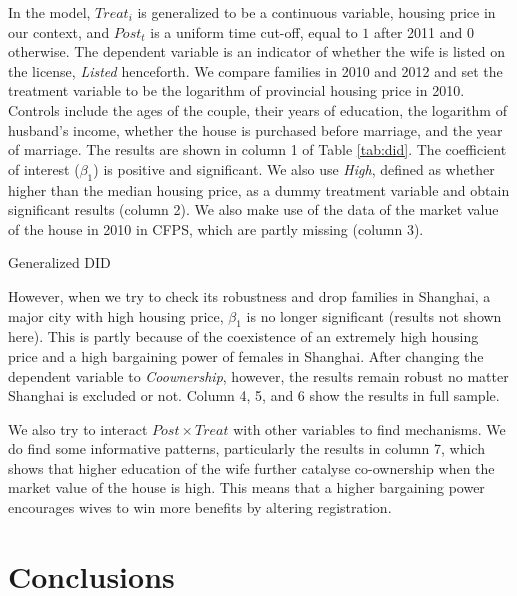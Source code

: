 \documentclass[11pt]{article}
\begin{document}
In the model, $Treat_{i}$ is generalized to be a continuous variable, housing price in our context, and $Post_t$ is a uniform time cut-off, equal to $1$ after 2011 and $0$ otherwise. The dependent variable is an indicator of whether the wife is listed on the license, \textit{Listed} henceforth. We compare families in 2010 and 2012 and set the treatment variable to be the logarithm of provincial housing price in 2010. Controls include the ages of the couple, their years of education, the logarithm of husband's income, whether the house is purchased before marriage, and the year of marriage. The results are shown in column 1 of Table \ref{tab:did}. The coefficient of interest ($\beta_1$) is positive and significant. We also use \textit{High}, defined as whether higher than the median housing price, as a dummy treatment variable and obtain significant results (column 2). We also make use of the data of the market value of the house in 2010 in CFPS, which are partly missing (column 3).  

\begin{table}
    \centering
    \caption{Generalized DID}
    \label{tab:did}
    \resizebox{\textwidth}{!}{
    }

\end{table}

However, when we try to check its robustness and drop families in Shanghai, a major city with high housing price, $\beta_1$ is no longer significant (results not shown here). This is partly because of the coexistence of an extremely high housing price and a high bargaining power of females in Shanghai. After changing the dependent variable to \textit{Coownership}, however, the results remain robust no matter Shanghai is excluded or not. Column 4, 5, and 6 show the results in full sample.

We also try to interact $Post\times Treat$ with other variables to find mechanisms. We do find some informative patterns, particularly the results in column 7, which shows that higher education of the wife further catalyse co-ownership when the market value of the house is high. This means that a higher bargaining power encourages wives to win more benefits by altering registration.

\section{Conclusions} \label{sec:conclusion}
\end{document}
